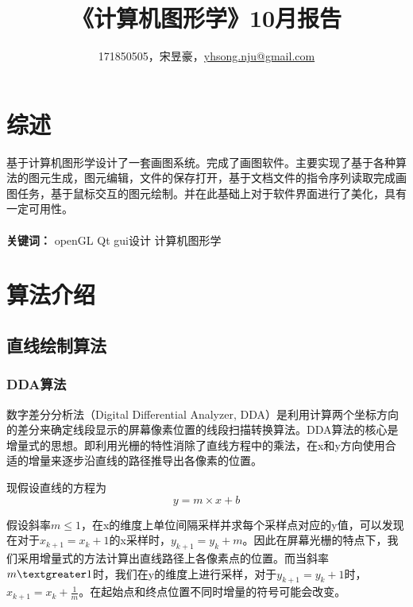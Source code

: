 \documentclass[a4paper,UTF8]{article}
\theoremstyle{definition}
\begin{document}
\title{\textbf{《计算机图形学》10月报告}}
\author{171850505，宋昱豪，\href{mailto:yhsong.nju@gmail.com}{yhsong.nju@gmail.com}}
\maketitle

\section{综述}
基于计算机图形学设计了一套画图系统。完成了画图软件。主要实现了基于各种算法的图元生成，图元编辑，文件的保存打开，基于文档文件的指令序列读取完成画图任务，基于鼠标交互的图元绘制。并在此基础上对于软件界面进行了美化，具有一定可用性。\\
\\ \textbf{关键词：} openGL \qquad  Qt gui设计 \qquad 计算机图形学
\section{算法介绍}
\subsection{直线绘制算法}
\subsubsection{DDA算法}
数字差分分析法（Digital Differential Analyzer, DDA）是利用计算两个坐标方向的差分来确定线段显示的屏幕像素位置的线段扫描转换算法。DDA算法的核心是增量式的思想。即利用光栅的特性消除了直线方程中的乘法，在x和y方向使用合适的增量来逐步沿直线的路径推导出各像素的位置。
\par 现假设直线的方程为
\begin{equation}
y=m\times x +b
\end{equation}
\par 假设斜率$m \leq 1$，在x的维度上单位间隔采样并求每个采样点对应的y值，可以发现在对于$x_{k+1}=x_{k}+1$的x采样时，$y_{k+1}=y_{k}+m$。因此在屏幕光栅的特点下，我们采用增量式的方法计算出直线路径上各像素点的位置。而当斜率$m \textgreater 1$时，我们在y的维度上进行采样，对于$y_{k+1}=y_{k}+1$时，$x_{k+1}=x_{k}+\frac {1}{m}$。在起始点和终点位置不同时增量的符号可能会改变。
\end{document}
